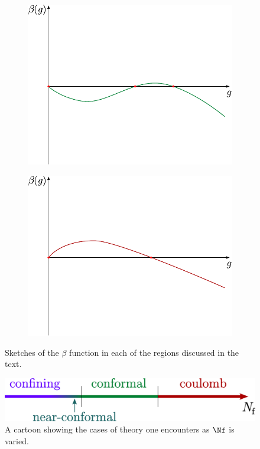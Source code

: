 \begin{figure}[htb]
	\begin{subfigure}[b]{0.4\textwidth}
		\center
		\includegraphics[width=\textwidth]{beta-conformal.pdf}
	\end{subfigure}
	\qquad
	\begin{subfigure}[b]{0.4\textwidth}
		\center
		\includegraphics[width=\textwidth]{beta-coulomb.pdf}
	\end{subfigure}	
	\caption{Sketches of the $\beta$ function in each of the regions discussed in the text.}
\end{figure}

\begin{figure}[htb]
	\center
	\includegraphics[width=0.5\columnwidth]{phasediagram.pdf}
	\caption{A cartoon showing the cases of theory one encounters as $\Nf$ is varied.}
	\label{fig:phasediag}
\end{figure}

